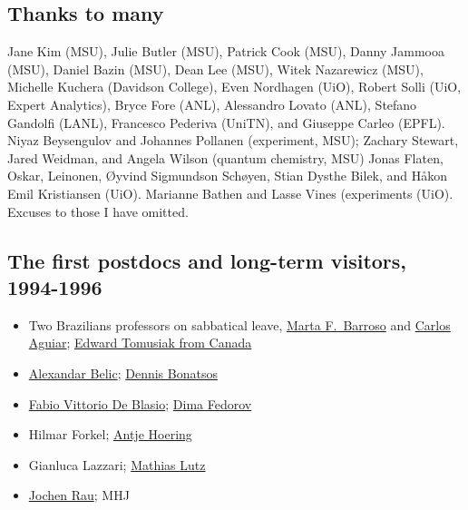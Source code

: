 \documentclass[%
oneside,                 %
final,                   %
10pt]{article}
\begin{document}
\subsection{Thanks to many}

Jane Kim (MSU), Julie Butler (MSU), Patrick Cook (MSU), Danny Jammooa (MSU), Daniel Bazin (MSU), Dean Lee (MSU), Witek Nazarewicz (MSU), Michelle Kuchera (Davidson College), Even Nordhagen (UiO), Robert Solli (UiO, Expert Analytics), Bryce Fore (ANL), Alessandro Lovato (ANL), Stefano Gandolfi (LANL), Francesco Pederiva (UniTN), and Giuseppe Carleo (EPFL). 
Niyaz Beysengulov and Johannes Pollanen (experiment, MSU); Zachary Stewart, Jared Weidman, and Angela Wilson (quantum chemistry, MSU)
Jonas Flaten, Oskar, Leinonen, Øyvind Sigmundson Schøyen, Stian Dysthe Bilek, and Håkon Emil Kristiansen (UiO). Marianne Bathen and Lasse Vines (experiments (UiO). Excuses to those I have omitted.

\subsection{The first postdocs and long-term visitors, 1994-1996}

\begin{itemize}
\item Two Brazilians professors on sabbatical leave, \href{{https://www.if.ufrj.br/en/docentes/marta-feijo-barroso/}}{Marta F.~Barroso} and \href{{https://www.if.ufrj.br/~carlos/carlos.html}}{Carlos Aguiar}; \href{{https://artsandscience.usask.ca/profile/ETomusiak}}{Edward Tomusiak from Canada}

\item \href{{http://www.scl.rs/scl-members/members/28-scl-members/members/413-aleksandar-belic-cv}}{Alexandar Belic}; \href{{http://www.inp.demokritos.gr/staff-members/dennis-bonatsos/}}{Dennis Bonatsos}

\item \href{{https://en.unimib.it/fabio-vittorio-de-blasio}}{Fabio Vittorio De Blasio}; \href{{https://pure.au.dk/portal/en/persons/dmitri-fedorov(9a03b124-d457-419c-b2e6-ca4e686b3b96).html}}{Dima Fedorov}

\item Hilmar Forkel; \href{{https://www.crab.org/research-statisticians.html}}{Antje Hoering}

\item Gianluca Lazzari; \href{{https://www.physik.tu-darmstadt.de/der_fachbereich/lehrende_physik/professor_innen_details_26176.en.jsp}}{Mathias Lutz}

\item \href{{https://www.q-info.org/about-me/}}{Jochen Rau}; MHJ
\end{itemize}
\end{document}
